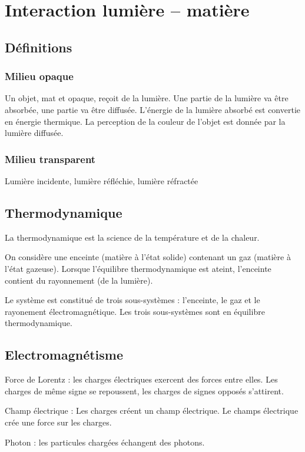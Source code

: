 \section{Interaction lumière -- matière}

\subsection{Définitions}

\subsubsection{Milieu opaque}
Un objet, mat et opaque, reçoit de la lumière. Une partie de la lumière va être absorbée, une partie va être  diffusée. L'énergie de la lumière absorbé est convertie en énergie thermique. La perception de la couleur de l'objet est donnée par la lumière diffusée.



\subsubsection{Milieu transparent}
Lumière incidente, lumière réfléchie, lumière réfractée



\subsection{Thermodynamique}
La thermodynamique est la science de la température et de la chaleur.


On considère une enceinte (matière à l'état solide) contenant un gaz (matière à l'état gazeuse). Lorsque l'équilibre thermodynamique est ateint, l'enceinte contient du rayonnement (de la lumière).

Le système est constitué de trois sous-systèmes : l'enceinte, le gaz et le rayonement électromagnétique. Les trois sous-systèmes sont en équilibre thermodynamique.

\subsection{Electromagnétisme}
Force de Lorentz : les charges électriques exercent des forces entre elles. Les charges de même signe se repoussent, les charges de signes opposés s'attirent.

Champ électrique : Les charges créent un champ électrique. Le champs électrique crée une force sur les charges.

Photon : les particules chargées échangent des photons.
